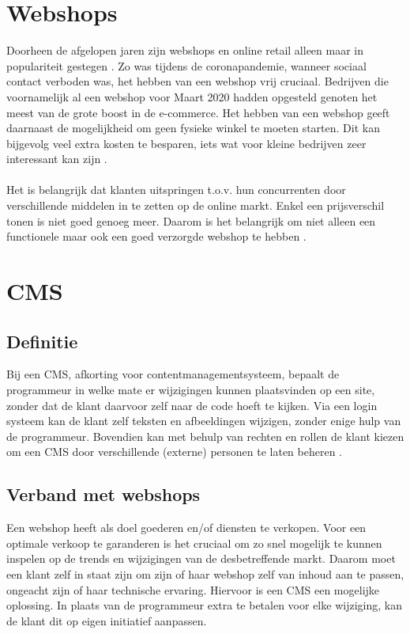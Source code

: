 \section{Webshops}
Doorheen de afgelopen jaren zijn webshops en online retail alleen maar in populariteit gestegen \autocite{Roggeveen2020}. Zo was tijdens de coronapandemie, wanneer sociaal contact verboden was, het hebben van een webshop vrij cruciaal. Bedrijven die voornamelijk al een webshop voor Maart 2020 hadden opgesteld genoten het meest van de grote boost in de e-commerce. Het hebben van een webshop geeft daarnaast de mogelijkheid om geen fysieke winkel te moeten starten. Dit kan bijgevolg veel extra kosten te besparen, iets wat voor kleine bedrijven zeer interessant kan zijn \autocite{Beckers2021}.
\\\\
Het is belangrijk dat klanten uitspringen t.o.v. hun concurrenten door verschillende middelen in te zetten op de online markt. Enkel een prijsverschil tonen is niet goed genoeg meer. Daarom is het belangrijk om niet alleen een functionele maar ook een goed verzorgde webshop te hebben \autocite{MatthiasF.Treutner2011}.
\section{CMS}
\subsection{Definitie}
Bij een CMS, afkorting voor contentmanagementsysteem, bepaalt de programmeur in welke mate er wijzigingen kunnen plaatsvinden op een site, zonder dat de klant daarvoor zelf naar de code hoeft te kijken. Via een login systeem kan de klant zelf teksten en afbeeldingen wijzigen, zonder enige hulp van de programmeur. Bovendien kan met behulp van rechten en rollen de klant kiezen om een CMS door verschillende (externe) personen te laten beheren \autocite{Browning2001}.
\subsection{Verband met webshops}
Een webshop heeft als doel goederen en/of diensten te verkopen. Voor een optimale verkoop te garanderen is het cruciaal om zo snel mogelijk te kunnen inspelen op de trends en wijzigingen van de desbetreffende markt. Daarom moet een klant zelf in staat zijn om zijn of haar webshop zelf van inhoud aan te passen, ongeacht zijn of haar technische ervaring. Hiervoor is een CMS een mogelijke oplossing. In plaats van de programmeur extra te betalen voor elke wijziging, kan de klant dit op eigen initiatief aanpassen.
